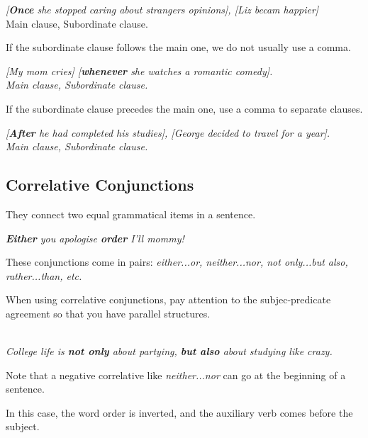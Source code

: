 \documentclass[hidelinks,10pt,a4paper]{article}
\begin{document}
\begin{center}
	\textit{[\textbf{Once} she stopped caring about strangers opinions], [Liz becam happier]}\\
	Main clause, Subordinate clause.
\end{center}

If the subordinate clause follows the main one, we do not usually use a comma.

\begin{center}
	\textit{[My mom cries] [\textbf{whenever} she watches a romantic comedy].\\
	Main clause, Subordinate clause.}
\end{center}

If the subordinate clause precedes the main one, use a comma to separate clauses.

\begin{center}
	\textit{[\textbf{After} he had completed his studies], [George decided to travel for a year].\\
	Main clause, Subordinate clause.}
\end{center}

\subsection{Correlative Conjunctions}
They connect two equal grammatical items in a sentence.

\begin{center}
	\textit{\textbf{Either} you apologise \textbf{order} I'll mommy!}
\end{center}

These conjunctions come in pairs: \textit{either...or, neither...nor, not only...but also, rather...than, etc.}

When using correlative conjunctions, pay attention to the subjec-predicate agreement so that you have parallel structures.

\begin{center}
	\textit{\\
	College life is \textbf{not only} about partying, \textbf{but also} about studying like crazy.}
\end{center}

Note that a negative correlative like \textit{neither...nor} can go at the beginning of a sentence.

In this case, the word order is inverted, and the auxiliary verb comes before the subject.
\end{document}
